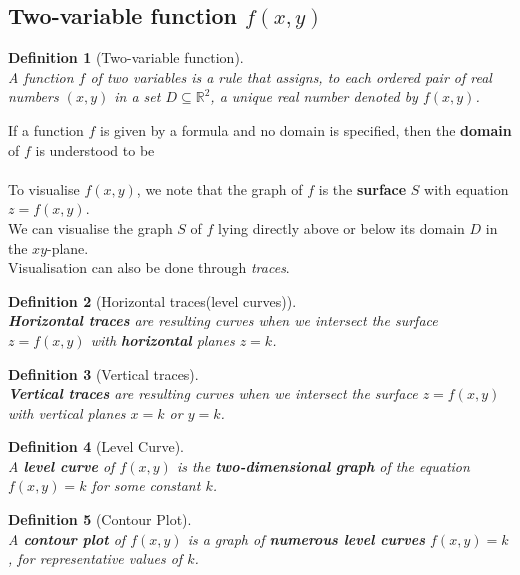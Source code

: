\documentclass[12pt]{article}
\newtheorem{definition}{Definition}[section]
\theoremstyle{definition}
\begin{document}
\subsection{Two-variable function $f(x,y)$}
\begin{definition}[Two-variable function]
\hfill\\\normalfont A function $f$ of two variables is a rule that assigns, to each \textit{ordered pair} of real numbers $(x,y)$ in a set $D\subseteq \mathbb{R}^2$, a \textit{unique} real number denoted by $f(x,y)$.
\end{definition}
If a function $f$ is given by a formula and no domain is specified, then the \textbf{domain} of $f$ is understood to be\\
\\
To visualise $f(x,y)$, we note that the graph of $f$ is the \textbf{surface} $S$ with equation $z=f(x,y)$.\\We can visualise the graph $S$ of $f$ lying directly above or below its domain $D$ in the $xy$-plane.\\
Visualisation can also be done through \textit{traces}.
\begin{definition}[Horizontal traces(level curves)] 
\hfill\\\normalfont \textbf{Horizontal traces} are resulting curves when we intersect the surface $z=f(x,y)$ with \textbf{horizontal} planes $z=k$.
\end{definition}
\begin{definition}[Vertical traces]
\hfill\\\normalfont \textbf{Vertical traces} are resulting curves when we intersect the surface $z=f(x,y)$ with vertical planes $x=k$ or $y=k$.
\end{definition}
\begin{definition}[Level Curve]
\hfill\\\normalfont A \textbf{level curve} of $f(x,y)$ is the \textbf{two-dimensional graph} of the equation $f(x,y)=k$ for some constant $k$.
\end{definition}
\begin{definition}[Contour Plot]
\hfill\\\normalfont A \textbf{contour plot} of $f(x,y)$ is a graph of \textbf{numerous level curves} $f(x,y)=k$, for representative values of $k$.
\end{definition}
\end{document}
